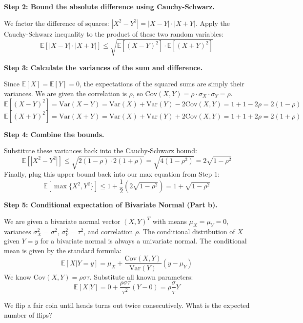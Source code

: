 \begin{solution}
\textbf{Step 2: Bound the absolute difference using Cauchy-Schwarz.}

We factor the difference of squares: $|X^2 - Y^2| = |X-Y| \cdot |X+Y|$.
Apply the Cauchy-Schwarz inequality to the product of these two random variables:
\[ \mathbb{E}[|X-Y| \cdot |X+Y|] \leq \sqrt{\mathbb{E}[(X-Y)^2] \cdot \mathbb{E}[(X+Y)^2]} \]

\textbf{Step 3: Calculate the variances of the sum and difference.}

Since $\mathbb{E}[X] = \mathbb{E}[Y] = 0$, the expectations of the squared sums are simply their variances. We are given the correlation is $\rho$, so $\text{Cov}(X,Y) = \rho \cdot \sigma_X \cdot \sigma_Y = \rho$.
\[ \mathbb{E}[(X-Y)^2] = \text{Var}(X-Y) = \text{Var}(X) + \text{Var}(Y) - 2\text{Cov}(X, Y) = 1 + 1 - 2\rho = 2(1-\rho) \]
\[ \mathbb{E}[(X+Y)^2] = \text{Var}(X+Y) = \text{Var}(X) + \text{Var}(Y) + 2\text{Cov}(X, Y) = 1 + 1 + 2\rho = 2(1+\rho) \]

\textbf{Step 4: Combine the bounds.}

Substitute these variances back into the Cauchy-Schwarz bound:
\[ \mathbb{E}[|X^2 - Y^2|] \leq \sqrt{ 2(1-\rho) \cdot 2(1+\rho) } = \sqrt{4(1-\rho^2)} = 2\sqrt{1-\rho^2} \]
Finally, plug this upper bound back into our max equation from Step 1:
\[ \mathbb{E}[\max\{X^2, Y^2\}] \leq 1 + \frac{1}{2} \left( 2\sqrt{1-\rho^2} \right) = 1 + \sqrt{1-\rho^2} \]

\textbf{Step 5: Conditional expectation of Bivariate Normal (Part b).}

We are given a bivariate normal vector $(X,Y)^T$ with means $\mu_X = \mu_Y = 0$, variances $\sigma_X^2 = \sigma^2$, $\sigma_Y^2 = \tau^2$, and correlation $\rho$.
The conditional distribution of $X$ given $Y=y$ for a bivariate normal is always a univariate normal. The conditional mean is given by the standard formula:
\[ \mathbb{E}[X|Y=y] = \mu_X + \frac{\text{Cov}(X, Y)}{\text{Var}(Y)}(y - \mu_Y) \]
We know $\text{Cov}(X, Y) = \rho \sigma \tau$.
Substitute all known parameters:
\[ \mathbb{E}[X|Y] = 0 + \frac{\rho \sigma \tau}{\tau^2}(Y - 0) = \rho \frac{\sigma}{\tau} Y \]
\end{solution}

\begin{exercise}\label{probability:2015:2}
We flip a fair coin until heads turns out twice consecutively. What is the expected number of flips?
\end{exercise}

